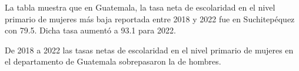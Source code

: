 \justifying La tabla muestra que en Guatemala, la tasa neta de escolaridad en el nivel primario de mujeres más baja reportada entre 2018 y 2022 fue en Suchitepéquez con 79.5. Dicha tasa aumentó a 93.1 para 2022.

De 2018 a 2022 las tasas netas de escolaridad en el nivel primario de mujeres en el departamento de Guatemala sobrepasaron la de hombres. 
